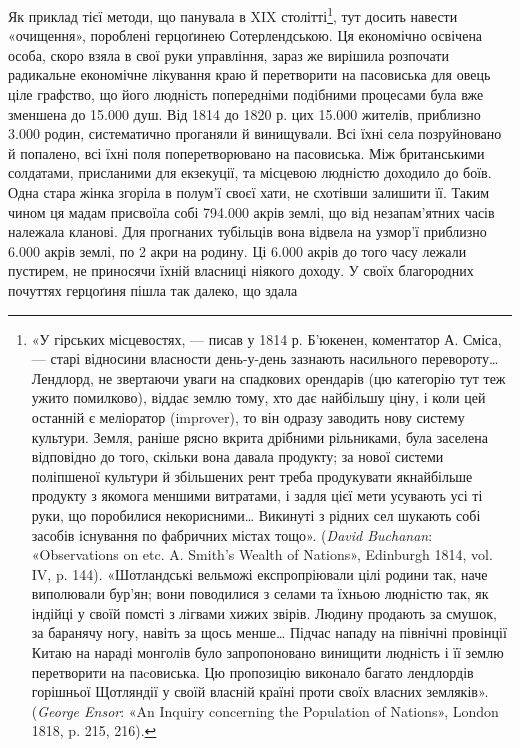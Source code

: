 Як приклад тієї методи, що панувала в XIX столітті\footnote{
«У гірських місцевостях, — писав у 1814 р. Б’юкенен, коментатор
А. Сміса, — старі відносини власности день-у-день зазнають насильного
перевороту\dots{} Лендлорд, не звертаючи уваги на спадкових орендарів
(цю категорію тут теж ужито помилково), віддає землю тому, хто дає найбільшу
ціну, і коли цей останній є меліоратор (improver), то він одразу заводить
нову систему культури. Земля, раніше рясно вкрита дрібними рільниками,
була заселена відповідно до того, скільки вона давала продукту;
за нової системи поліпшеної культури й збільшених рент треба продукувати
якнайбільше продукту з якомога меншими витратами, і задля цієї
мети усувають усі ті руки, що поробилися некорисними\dots{} Викинуті з
рідних сел шукають собі засобів існування по фабричних містах тощо».
(\emph{David Buchanan}: «Observations on etc. A. Smith’s Wealth of Nations»,
Edinburgh 1814, vol. IV, p. 144). «Шотландські вельможі експропріювали
цілі родини так, наче виполювали бур’ян; вони поводилися з селами
та їхньою людністю так, як індійці у своїй помсті з лігвами хижих звірів.
Людину продають за смушок, за баранячу ногу, навіть за щось
менше\dots{} Підчас нападу на північні провінції Китаю на нараді монголів
було запропоновано винищити людність і її землю перетворити на паcовиська.
Цю пропозицію виконало багато лендлордів горішньої Щотляндії
у своїй власній країні проти своїх власних земляків». (\emph{George
Ensor}: «An Inquiry concerning the Population of Nations», London 1818,
p. 215, 216).
}, тут досить
навести «очищення», пороблені герцоґинею Сотерлендською.
Ця економічно освічена особа, скоро взяла в свої руки управління,
зараз же вирішила розпочати радикальне економічне лікування
краю й перетворити на пасовиська для овець ціле графство,
що його людність попередніми подібними процесами була
вже зменшена до \num{15.000} душ. Від 1814 до 1820 р. цих \num{15.000} жителів,
приблизно \num{3.000} родин, систематично проганяли й винищували.
Всі їхні села позруйновано й попалено, всі їхні поля
поперетворювано на пасовиська. Між британськими солдатами,
присланими для екзекуції, та місцевою людністю доходило до
боїв. Одна стара жінка згоріла в полум’ї своєї хати, не схотівши
залишити її. Таким чином ця мадам присвоїла собі \num{794.000} акрів
землі, що від незапам’ятних часів належала кланові. Для прогнаних
тубільців вона відвела на узмор’ї приблизно \num{6.000} акрів
землі, по 2 акри на родину. Ці \num{6.000} акрів до того часу лежали
пустирем, не приносячи їхній власниці ніякого доходу. У своїх
благородних почуттях герцоґиня пішла так далеко, що здала
